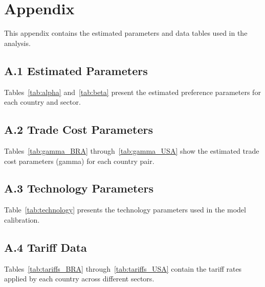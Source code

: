 \section*{Appendix}

This appendix contains the estimated parameters and data tables used in the analysis.

\subsection*{A.1 Estimated Parameters}
Tables~\ref{tab:alpha} and~\ref{tab:beta} present the estimated preference parameters for each country and sector.

\subsection*{A.2 Trade Cost Parameters}
Tables~\ref{tab:gamma_BRA} through~\ref{tab:gamma_USA} show the estimated trade cost parameters (gamma) for each country pair.

\subsection*{A.3 Technology Parameters}
Table~\ref{tab:technology} presents the technology parameters used in the model calibration.

\subsection*{A.4 Tariff Data}
Tables~\ref{tab:tariffs_BRA} through~\ref{tab:tariffs_USA} contain the tariff rates applied by each country across different sectors.


\begin{landscape}


\end{landscape}

